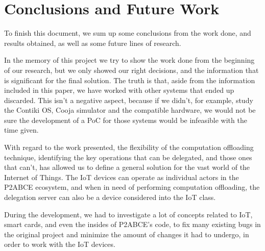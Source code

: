 \section{Conclusions and Future Work}\label{ch:conclusions}

To finish this document, we sum up some conclusions from the work done, and results obtained, as well as some future lines of research.



In the memory of this project we try to show the work done from the beginning of our research, but we only showed our right decisions, and the information that is significant for the final solution. The truth is that, aside from the information included in this paper, we have worked with other systems that ended up discarded. This isn't a negative aspect, because if we didn't, for example, study the Contiki OS, Cooja simulator and the compatible hardware, we would not be sure the development of a PoC for those systems would be infeasible with the time given.


With regard to the work presented, the flexibility of the computation offloading technique, identifying the key operations that can be delegated, and those ones that can't, has allowed us to define a general solution for the vast world of the Internet of Things. The IoT devices can operate as individual actors in the P2ABCE ecosystem, and when in need of performing computation offloading, the delegation server can also be a device considered into the IoT class.




During the development, we had to investigate a lot of concepts related to IoT, smart cards, and even the insides of P2ABCE's code, to fix many existing bugs in the original project and minimize the amount of changes it had to undergo, in order to work with the IoT devices.%


